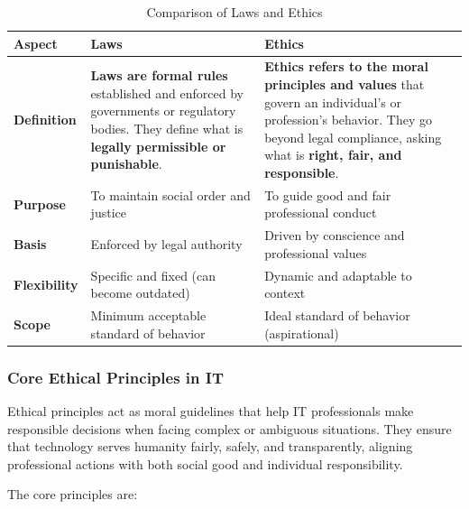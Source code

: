 \begin{table}[htbp]
\centering
\renewcommand{\arraystretch}{1.35}
\begin{tabular}{|p{3cm}|p{7cm}|p{7cm}|}
\hline
\textbf{Aspect} & \textbf{Laws} & \textbf{Ethics} \\
\hline

\textbf{Definition} &
\textbf{Laws are formal rules} established and enforced by governments or regulatory bodies. They define what is \textbf{legally permissible or punishable}. &
\textbf{Ethics refers to the moral principles and values} that govern an individual's or profession’s behavior. They go beyond legal compliance, asking what is \textbf{right, fair, and responsible}. \\
\hline

\textbf{Purpose} &
To maintain social order and justice &
To guide good and fair professional conduct \\
\hline

\textbf{Basis} &
Enforced by legal authority &
Driven by conscience and professional values \\
\hline

\textbf{Flexibility} &
Specific and fixed (can become outdated) &
Dynamic and adaptable to context \\
\hline

\textbf{Scope} &
Minimum acceptable standard of behavior &
Ideal standard of behavior (aspirational) \\
\hline

\end{tabular}
\caption{Comparison of Laws and Ethics}
\end{table}

\subsubsection{Core Ethical Principles in IT}

\indent 

Ethical principles act as moral guidelines that help IT professionals make responsible decisions when facing complex or ambiguous situations. They ensure that technology serves humanity fairly, safely, and transparently, aligning professional actions with both social good and individual responsibility.

The core principles are:

